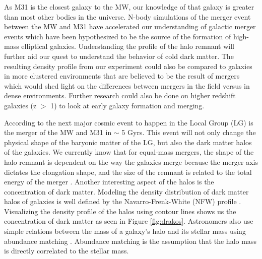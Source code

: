 \documentclass[linenumbers, twocolumn]{aastex631}
\begin{document}
As M31 is the closest galaxy to the MW, our knowledge of that galaxy is greater than most other bodies in the universe. 
N-body simulations of the merger event between the MW and M31 have accelerated our understanding of galactic merger events which have been hypothesized to be the source of the formation of high-mass elliptical galaxies. 
Understanding the profile of the halo remnant will further aid our quest to understand the behavior of cold dark matter. 
The resulting density profile from our experiment could also be compared to galaxies in more clustered environments that are believed to be the result of mergers which would shed light on the differences between mergers in the field versus in dense environments.
Further research could also be done on higher redshift galaxies (z $>$ 1) to look at early galaxy formation and merging.


According to \cite{2012VanDerMarel} the next major cosmic event to happen in the Local Group (LG) is the merger of the MW and M31 in $\sim$ 5 Gyrs. 
This event will not only change the physical shape of the baryonic matter of the LG, but also the dark matter halos of the galaxies.
We currently know that for equal-mass mergers, the shape of the halo remnant is dependent on the way the galaxies merge because the merger axis dictates the elongation shape, and the size of the remnant is related to the total energy of the merger \citep{2019drakos}. 
Another interesting aspect of the halos is the concentration of dark matter.
Modeling the density distribution of dark matter halos of galaxies is well defined by the Navarro-Frenk-White (NFW) profile \citep{1996NFW}. Visualizing the density profile of the halos using contour lines shows us the concentration of dark matter as seen in Figure \ref{fig:drakos}.
Astronomers also use simple relations between the mass of a galaxy's halo and its stellar mass using abundance matching \citep{2018Wechsler}. Abundance matching is the assumption that the halo mass is directly correlated to the stellar mass.
\end{document}

